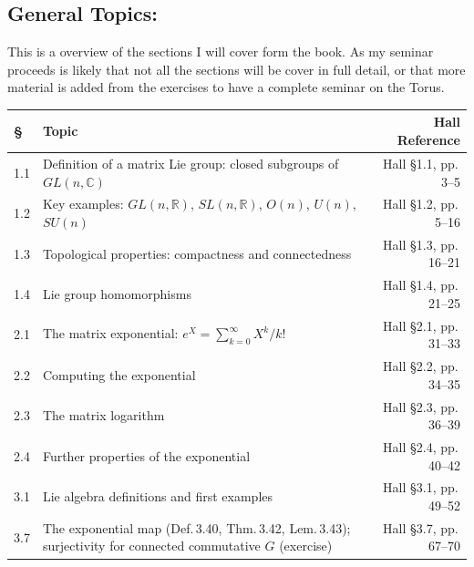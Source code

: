 \begin{assignment}[
  header=HeaderA,
  body=BodyA,
  title={Guia de Projecto},
  duedate={\today},
  toc=false,
  toctitle={},
  exlist=false
]
\section*{General Topics:}

This is a overview of the sections I will cover form the book. As my seminar proceeds is likely that not all the sections will be cover in full detail, or that more material is added from the exercises to have a complete seminar on the Torus.

\newpage

\begin{table}[H]
\centering
\renewcommand{\arraystretch}{1.45}
\begin{tabular}{@{} p{0.55cm} p{7.2cm} R @{}}
\toprule
\textbf{\S} & \textbf{Topic} & \textbf{Hall Reference} \\
\midrule
 
1.1 & Definition of a matrix Lie group:
      closed subgroups of $GL(n,\mathbb{C})$
      & Hall \S1.1, pp.\,3--5 \\[4pt]
 
1.2 & Key examples: $GL(n,\mathbb{R})$, $SL(n,\mathbb{R})$,
      $O(n)$, $U(n)$, $SU(n)$
      & Hall \S1.2, pp.\,5--16 \\[4pt]
 
1.3 & Topological properties: compactness and connectedness
      & Hall \S1.3, pp.\,16--21 \\[4pt]
 
1.4 & Lie group homomorphisms
      & Hall \S1.4, pp.\,21--25 \\[6pt]
 
\midrule
 
2.1 & The matrix exponential:
      $e^{X}=\sum_{k=0}^{\infty}X^{k}/k!$
      & Hall \S2.1, pp.\,31--33 \\[4pt]
 
2.2 & Computing the exponential
      & Hall \S2.2, pp.\,34--35 \\[4pt]
 
2.3 & The matrix logarithm
      & Hall \S2.3, pp.\,36--39 \\[4pt]
 
2.4 & Further properties of the exponential
      & Hall \S2.4, pp.\,40--42 \\[6pt]
 
\midrule
 
3.1 & Lie algebra definitions and first examples
      & Hall \S3.1, pp.\,49--52 \\[4pt]
 
3.7 & The exponential map (Def.\,3.40, Thm.\,3.42, Lem.\,3.43);
      surjectivity for connected commutative $G$ (exercise)
      & Hall \S3.7, pp.\,67--70 \\[6pt]
 

\end{tabular}
\end{table}
\end{assignment}
